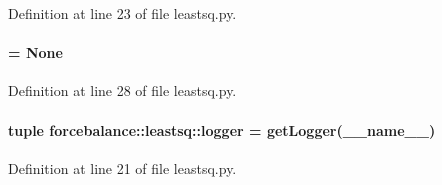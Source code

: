 \-Definition at line 23 of file leastsq.\-py.

\hypertarget{namespaceforcebalance_1_1leastsq_ae598872a62bd2bdba5b69abf3b9524fe}{
\paragraph[{\-L\-A\-S\-T\-\_\-\-M\-V\-A\-L\-S}]{ = \-None}}\label{namespaceforcebalance_1_1leastsq_ae598872a62bd2bdba5b69abf3b9524fe}


\-Definition at line 28 of file leastsq.\-py.

\hypertarget{namespaceforcebalance_1_1leastsq_a032a24b7852e456e95ed17a37c87f92c}{
\paragraph[{logger}]{\setlength{\rightskip}{0pt plus 5cm}tuple {\bf forcebalance\-::leastsq\-::logger} = get\-Logger(\-\_\-\-\_\-name\-\_\-\-\_\-)}}\label{namespaceforcebalance_1_1leastsq_a032a24b7852e456e95ed17a37c87f92c}


\-Definition at line 21 of file leastsq.\-py.

